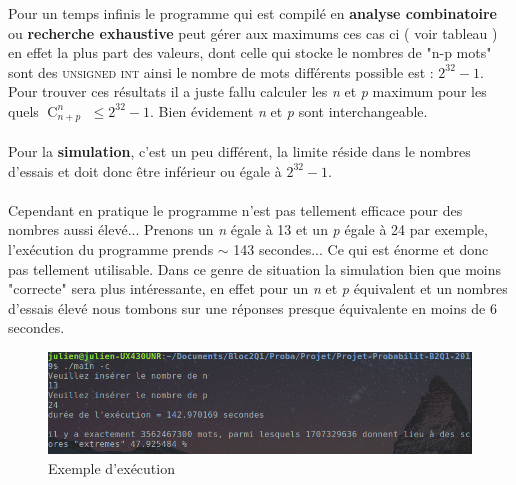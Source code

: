 \documentclass[a4paper, 11pt, oneside]{article}
\DeclareMathOperator{\comb}{C}
\begin{document}
Pour un temps infinis le programme qui est compilé en \textbf{analyse combinatoire} ou \textbf{recherche exhaustive} peut gérer aux maximums ces cas ci ( voir tableau ) en effet la plus part des valeurs, dont celle qui stocke le nombres de "n-p mots" sont des \textsc{unsigned int} ainsi le nombre de mots différents possible est : $2^{32}-1$. Pour trouver ces résultats il a juste fallu calculer les \textit{n} et \textit{p} maximum pour les quels $\comb_{n+p}^n$ $\leq 2^{32}-1$.
Bien évidement \textit{n} et \textit{p} sont interchangeable. \\ \\Pour la \textbf{simulation}, c'est un peu différent, la limite réside dans le nombres d'essais et doit donc être inférieur ou égale à $2^{32}-1$. \\ \\ Cependant en pratique le programme n'est pas tellement efficace pour des nombres aussi élevé... Prenons un \textit{n} égale à 13 et un \textit{p} égale à 24 par exemple, l’exécution du programme prends $\sim$ 143 secondes... Ce qui est énorme et donc pas tellement utilisable. Dans ce genre de situation la simulation bien que moins "correcte" sera plus intéressante, en effet pour un \textit{n} et \textit{p} équivalent et un nombres d'essais élevé nous tombons sur une réponses presque équivalente en moins de 6 secondes. 
\\
     \begin{figure}[!h]
			\centering
\includegraphics[scale=0.25]{exemple2.png}
			\caption{Exemple d’exécution}
		\end{figure}


\newpage
\end{document}
